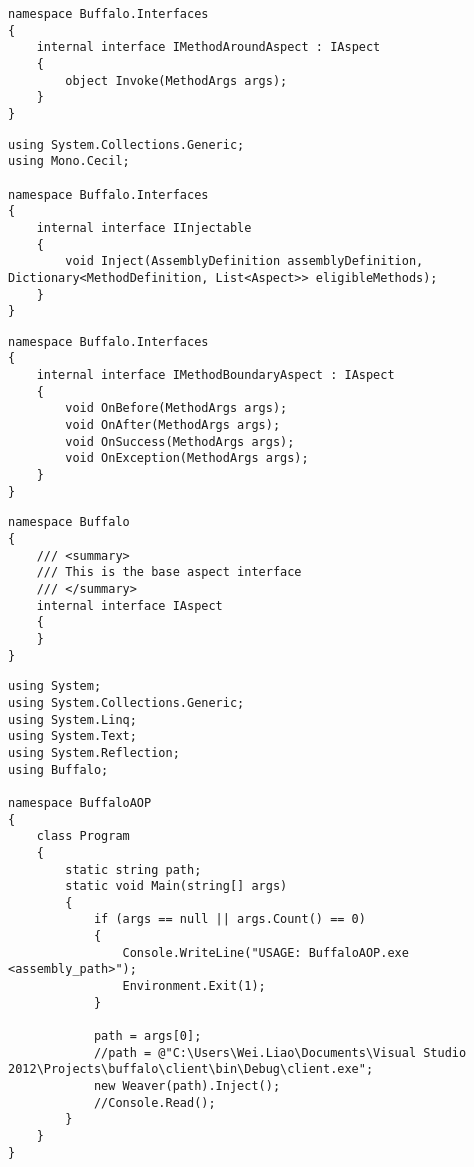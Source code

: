 \begin{lstlisting}[caption={../buffalo/Interfaces/IMethodAroundAspect.cs}, label=../buffalo/Interfaces/IMethodAroundAspect.cs, frame=tb, basicstyle=\scriptsize]﻿namespace Buffalo.Interfaces
{
    internal interface IMethodAroundAspect : IAspect
    {
        object Invoke(MethodArgs args);
    }
}
\end{lstlisting}

\begin{lstlisting}[caption={../buffalo/Interfaces/IInjectable.cs}, label=../buffalo/Interfaces/IInjectable.cs, frame=tb, basicstyle=\scriptsize]﻿using System.Collections.Generic;
using Mono.Cecil;

namespace Buffalo.Interfaces
{
    internal interface IInjectable
    {
        void Inject(AssemblyDefinition assemblyDefinition, Dictionary<MethodDefinition, List<Aspect>> eligibleMethods);
    }
}
\end{lstlisting}

\begin{lstlisting}[caption={../buffalo/Interfaces/IMethodBoundaryAspect.cs}, label=../buffalo/Interfaces/IMethodBoundaryAspect.cs, frame=tb, basicstyle=\scriptsize]﻿namespace Buffalo.Interfaces
{
    internal interface IMethodBoundaryAspect : IAspect
    {
        void OnBefore(MethodArgs args);
        void OnAfter(MethodArgs args);
        void OnSuccess(MethodArgs args);
        void OnException(MethodArgs args);
    }
}
\end{lstlisting}

\begin{lstlisting}[caption={../buffalo/Interfaces/IAspect.cs}, label=../buffalo/Interfaces/IAspect.cs, frame=tb, basicstyle=\scriptsize]﻿namespace Buffalo
{
    /// <summary>
    /// This is the base aspect interface
    /// </summary>
    internal interface IAspect
    {
    }
}
\end{lstlisting}

\begin{lstlisting}[caption={../../buffalo/BuffaloAOP/Program.cs}, label=../../buffalo/BuffaloAOP/Program.cs, frame=tb, basicstyle=\scriptsize]﻿using System;
using System.Collections.Generic;
using System.Linq;
using System.Text;
using System.Reflection;
using Buffalo;

namespace BuffaloAOP
{
    class Program
    {
        static string path;
        static void Main(string[] args)
        {
            if (args == null || args.Count() == 0)
            {
                Console.WriteLine("USAGE: BuffaloAOP.exe <assembly_path>");
                Environment.Exit(1);
            }

            path = args[0];
            //path = @"C:\Users\Wei.Liao\Documents\Visual Studio 2012\Projects\buffalo\client\bin\Debug\client.exe";
            new Weaver(path).Inject();
            //Console.Read();
        }
    }
}
\end{lstlisting}

